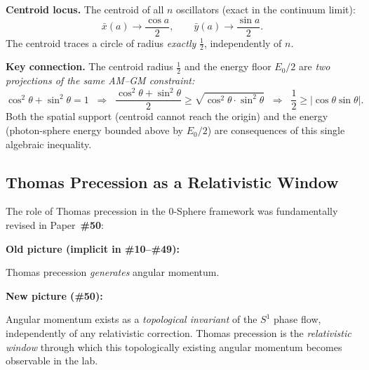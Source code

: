 \documentclass[12pt,letterpaper]{article}
\newcommand{\paperno}[1]{\textbf{\#{}#1}}
\newcommand{\iphase}{\theta}
\begin{document}
\textbf{Centroid locus.} The centroid of all $n$ oscillators (exact in the continuum limit):
\begin{equation}
\bar{x}(a) \to \frac{\cos a}{2}, \qquad \bar{y}(a) \to \frac{\sin a}{2}.
\end{equation}
The centroid traces a circle of radius \emph{exactly} $\frac{1}{2}$, independently of $n$.

\begin{mdframed}[style=greenbox]
\textbf{Key connection.}
The centroid radius $\frac{1}{2}$ and the energy floor $E_0/2$ are \emph{two projections
of the same AM--GM constraint:}
\begin{equation}
\cos^2\iphase + \sin^2\iphase = 1
\;\;\Rightarrow\;\;
\frac{\cos^2\iphase + \sin^2\iphase}{2} \geq \sqrt{\cos^2\iphase\cdot\sin^2\iphase}
\;\;\Rightarrow\;\;
\frac{1}{2} \geq |\cos\iphase\sin\iphase|.
\end{equation}
Both the spatial support (centroid cannot reach the origin) and the energy (photon-sphere
energy bounded above by $E_0/2$) are consequences of this single algebraic inequality.
\end{mdframed}

\subsection{Thomas Precession as a Relativistic Window}

The role of Thomas precession in the 0-Sphere framework was fundamentally revised
in Paper~\paperno{50}:

\begin{mdframed}[style=greenbox]
\begin{center}
\textbf{Old picture (implicit in \paperno{10}--\paperno{49}):}\par\vspace{4pt}
Thomas precession \emph{generates} angular momentum.
\end{center}

\vspace{0.3cm}
\begin{center}
\textbf{New picture (\paperno{50}):}\par\vspace{4pt}
Angular momentum exists as a \emph{topological invariant} of the $S^1$ phase flow,
independently of any relativistic correction.
Thomas precession is the \emph{relativistic window} through which this topologically
existing angular momentum becomes observable in the lab.
\end{center}
\end{mdframed}
\end{document}
